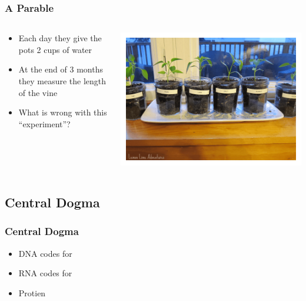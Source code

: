 \documentclass[14pt]{beamer}
\begin{document}
\begin{frame}
\frametitle{A Parable}
\begin{columns}
	\begin{column}{0.5\textwidth}
		\begin{itemize}
			\item<+-> Each day they give the pots 2 cups of water
			\item<+-> At the end of 3 months they measure the length of the vine
			\item<+-> What is wrong with this ``experiment''?
		\end{itemize}
		\end{column}
	\begin{column}{0.5\textwidth}
		\begin{center}
     		\includegraphics[width=1\textwidth]{images_20170912_vines.png}
     	\end{center}
	\end{column}
\end{columns}
\end{frame}

\subsection{Central Dogma}

\begin{frame}
\frametitle{Central Dogma}
\begin{itemize}
	\item<+-> DNA codes for
	\item<+-> RNA codes for
	\item<+-> Protien
\end{itemize}
\end{frame}
\end{document}
